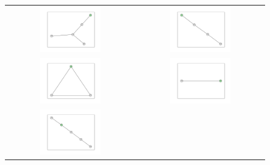 \documentclass[12pt, a4paper]{extarticle}
\begin{document}
\begin{figure}\centering\begin{tabularx}{\textwidth}{cc}
\includegraphics[width=0.5\textwidth]{task11-graphlets/5_10-14-13-21-23.pdf} &
\includegraphics[width=0.5\textwidth]{task11-graphlets/4_10-16-25-23.pdf} \\
\includegraphics[width=0.5\textwidth]{task11-graphlets/3_25-23-24.pdf} &
\includegraphics[width=0.5\textwidth]{task11-graphlets/2_23-24.pdf} \\
\includegraphics[width=0.5\textwidth]{task11-graphlets/5_14-16-21-23-24.pdf} &

\end{tabularx}
\end{figure}
\end{document}
